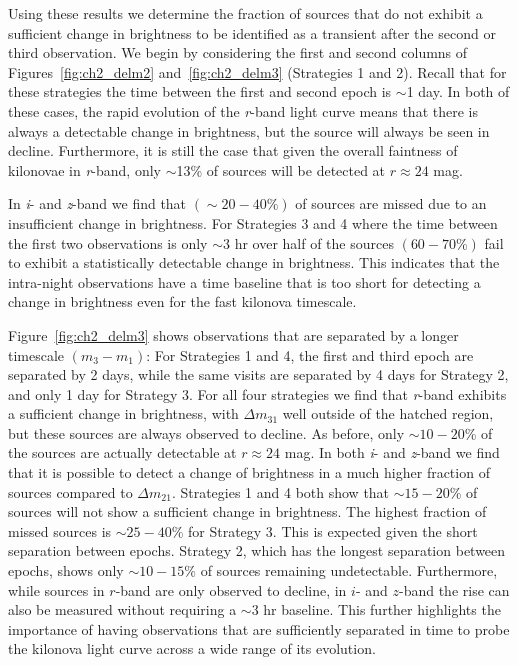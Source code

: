 Using these results we determine the fraction of sources that do not exhibit a sufficient change in brightness to be identified as a transient after the second or third observation. We begin by considering the first and second columns of Figures~\ref{fig:ch2_delm2} and~\ref{fig:ch2_delm3} (Strategies 1 and 2). Recall that for these strategies the time between the first and second epoch is $\sim$1 day. In both of these cases, the rapid evolution of the {\em r}-band light curve means that there is always a detectable change in brightness, but the source will always be seen in decline. Furthermore, it is still the case that given the overall faintness of kilonovae in {\em r}-band, only $\sim$13\% of sources will be detected at $r\approx24$ mag.

In {\em i}- and {\em z}-band we find that $(\sim 20-40\%)$ of sources are missed due to an insufficient change in brightness. For Strategies 3 and 4 where the time between the first two observations is only $\sim$3 hr over half of the sources $(60-70\%)$ fail to exhibit a statistically detectable change in brightness. This indicates that the intra-night observations have a time baseline that is too short for detecting a change in brightness even for the fast kilonova timescale.

Figure~\ref{fig:ch2_delm3} shows observations that are separated by a longer timescale $(m_3 - m_1)$: For Strategies 1 and 4, the first and third epoch are separated by 2 days, while the same visits are separated by 4 days for Strategy 2, and only 1 day for Strategy 3. For all four strategies we find that {\em r}-band exhibits a sufficient change in brightness, with $\Delta m_{31}$ well outside of the hatched region, but these sources are always observed to decline. As before, only $\sim10-20$\% of the sources are actually detectable at $r\approx24$ mag. In both {\em i}- and {\em z}-band we find that it is possible to detect a change of brightness in a much higher fraction of sources compared to $\Delta m_{21}$. Strategies 1 and 4 both show that $\sim 15-20\%$ of sources will not show a sufficient change in brightness. The highest fraction of missed sources is $\sim 25-40\%$ for Strategy 3. This is expected given the short separation between epochs. Strategy 2, which has the longest separation between epochs, shows only $\sim 10-15 \%$ of sources remaining undetectable. Furthermore, while sources in $r$-band are only observed to decline, in $i$- and $z$-band the rise can also be measured without requiring a $\sim$3 hr baseline. This further highlights the importance of having observations that are sufficiently separated in time to probe the kilonova light curve across a wide range of its evolution.

